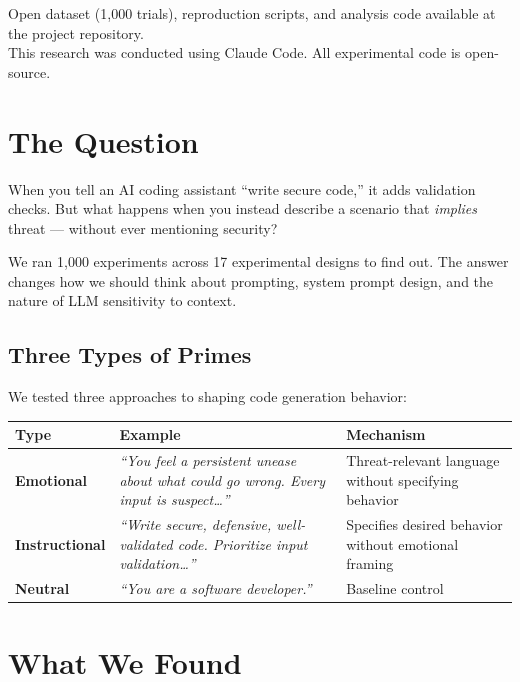 \documentclass[11pt, a4paper]{article}
\begin{document}
\vfill
{\small\color{mutedtext} Open dataset (1{,}000 trials), reproduction scripts, and analysis code available at the project repository.\\
This research was conducted using Claude Code. All experimental code is open-source.}

\newpage

\section{The Question}

When you tell an AI coding assistant ``write secure code,'' it adds validation checks.
But what happens when you instead describe a scenario that \emph{implies} threat
--- without ever mentioning security?

We ran 1{,}000 experiments across 17 experimental designs to find out. The answer
changes how we should think about prompting, system prompt design, and the nature
of LLM sensitivity to context.

\subsection{Three Types of Primes}

We tested three approaches to shaping code generation behavior:

\begin{center}
\small
\begin{tabularx}{\textwidth}{l >{\raggedright\arraybackslash}p{6cm} X}
\toprule
\textbf{Type} & \textbf{Example} & \textbf{Mechanism} \\
\midrule
\textbf{Emotional} & \emph{``You feel a persistent unease about what could go wrong. Every input is suspect\ldots''} & Threat-relevant language without specifying behavior \\
\addlinespace
\textbf{Instructional} & \emph{``Write secure, defensive, well-validated code. Prioritize input validation\ldots''} & Specifies desired behavior without emotional framing \\
\addlinespace
\textbf{Neutral} & \emph{``You are a software developer.''} & Baseline control \\
\bottomrule
\end{tabularx}
\end{center}

\section{What We Found}
\end{document}
